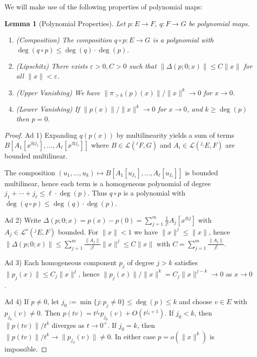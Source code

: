 \documentclass[10pt,a4paper]{article}
\theoremstyle{plain}
\newtheorem{lemma}[theorem]{Lemma}
\theoremstyle{definition}
\newcommand{\1}{\mathbb{1}} %
\newcommand{\ra}{\rightarrow} %
\newcommand{\tensor}{\otimes} %
\newcommand{\KL}{\mathcal{L}}
\newcommand{\eps}{\varepsilon} %
\newcommand{\tightlist}{\setlength{\itemsep}{0pt}\setlength{\parskip}{0pt}}
\begin{document}
We will make use of the following properties of polynomial maps:

\begin{lemma}[Polynomial Properties]

\label{lem:poly-props} Let \(p : E \ra F\), \(q: F \ra G\) be polynomial
maps.

\begin{enumerate}
\def\labelenumi{\arabic{enumi}.}
\tightlist
\item
  (Composition) The composition \(q \circ p: E \ra G\) is a polynomial
  with \(\deg(q \circ p) \leq \deg(q) \cdot \deg(p)\).
\item
  (Lipschitz) There exists \(\eps > 0, C>0\) such that
  \(\|\Delta(p; 0; x)\| \le C \|x\|\) for all \(\|x\| < \eps\).
\item
  (Upper Vanishing) We have \(\| \pi_{> k}(p)(x)\| / \|x\|^{k} \ra 0\)
  for \(x \ra 0\).
\item
  (Lower Vanishing) If \(\|p(x)\| / \|x\|^{k} \ra 0\) for \(x \ra 0\),
  and \(k \geq \deg(p)\) then \(p = 0\).
\end{enumerate}

\end{lemma}

\begin{proof}

Ad 1) Expanding \(q(p(x))\) by multilinearity yields a sum of terms
\(B[A_1[x^{\tensor j_1}], \dots, A_\ell[x^{\tensor j_\ell}]]\) where
\(B \in \KL(^\ell F, G)\) and \(A_i \in \KL(^{j_i} E, F)\) are bounded
multilinear.

The composition
\((u_1,\dots,u_k) \mapsto B[A_1[u_{I_1}], \dots, A_\ell[u_{I_\ell}]]\)
is bounded multilinear, hence each term is a homogeneous polynomial of
degree \(j_1 + \cdots + j_\ell \leq \ell \cdot \deg(p)\). Thus
\(q \circ p\) is a polynomial with
\(\deg(q \circ p) \leq \deg(q) \cdot \deg(p)\).

Ad 2) Write
\(\Delta(p; 0; x) = p(x) - p(0) = \sum_{j=1}^m \frac{1}{j!} A_j[x^{\tensor j}]\)
with \(A_j \in \KL^s(^j E, F)\) bounded. For \(\|x\| < 1\) we have
\(\|x\|^j \leq \|x\|\), hence
\(\|\Delta(p; 0; x)\| \leq \sum_{j=1}^m \frac{\|A_j\|}{j!} \|x\|^j \leq C\|x\|\)
with \(C = \sum_{j=1}^m \frac{\|A_j\|}{j!}\).

Ad 3) Each homogeneous component \(p_j\) of degree \(j > k\) satisfies
\(\|p_j(x)\| \leq C_j \|x\|^j\), hence
\(\|p_j(x)\|/\|x\|^k = C_j \|x\|^{j-k} \to 0\) as \(x \to 0\).

Ad 4) If \(p \neq 0\), let
\(j_0 := \min\{j : p_j \neq 0\} \leq \deg(p) \leq k\) and choose
\(v \in E\) with \(p_{j_0}(v) \neq 0\). Then
\(p(tv) = t^{j_0} p_{j_0}(v) + O(t^{j_0+1})\). If \(j_0 < k\), then
\(\|p(tv)\|/t^k\) diverges as \(t \to 0^+\). If \(j_0 = k\), then
\(\|p(tv)\|/t^k \to \|p_{j_0}(v)\| \neq 0\). In either case
\(p = o(\|x\|^k)\) is impossible.

\end{proof}
\end{document}
